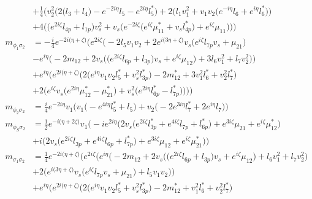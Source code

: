 \begin{itemize}
\begin{align}
 &+\frac{1}{4} \Big(v_{2}^{2} \Big(2 \Big(l_3 + l_4\Big) - e^{-2 i \eta } l_5  - e^{2 i \eta } l_5^* \Big)+2 \Big(l_1 v_{1}^{2}  + v_1 v_2 \Big(e^{-i \eta } l_6  + e^{i \eta } l_6^* \Big)\Big)\nonumber \\ 
 &+4 \Big(\Big(e^{2 i \zeta } l_{4p}  + l_{1p}\Big)v_{s}^{2}  + v_s \Big(e^{-2 i \zeta } \Big(e^{i \zeta } \mu_{11}^*  + v_s l_{4p}^* \Big) + e^{i \zeta } \mu_{11} \Big)\Big)\Big)\\ 
m_{\phi_1\sigma_2} &= -\frac{i}{4} e^{-2 i \Big(\eta +\zeta \Big)} \Big(e^{2 i \zeta } \Big(-2 l_5 v_1 v_2 +2 e^{i \Big(3 \eta +\zeta \Big)} v_s \Big(e^{i \zeta } l_{7p} v_s  + \mu_{21}\Big)\nonumber \\ 
 &- e^{i \eta } \Big(-2 m_{12}  + 2 v_s \Big(\Big(e^{2 i \zeta } l_{6p}  + l_{3p}\Big)v_s  + e^{i \zeta } \mu_{12} \Big) + 3 l_6 v_{1}^{2}  + l_7 v_{2}^{2} \Big)\Big)\nonumber \\ 
 &+e^{i \eta } \Big(e^{2 i \Big(\eta +\zeta \Big)} \Big(2 \Big(e^{i \eta } v_1 v_2 l_5^*  + v_{s}^{2} l_{3p}^* \Big) -2 m_{12}^*  + 3 v_{1}^{2} l_6^*  + v_{2}^{2} l_7^* \Big)\nonumber \\ 
 &+2 \Big(e^{i \zeta } v_s \Big(e^{2 i \eta } \mu_{12}^*  - \mu_{21}^* \Big) + v_{s}^{2} \Big(e^{2 i \eta } l_{6p}^*  - l_{7p}^* \Big)\Big)\Big)\Big)\\ 
m_{\phi_2\sigma_2} &= \frac{i}{4} e^{-2 i \eta } v_1 \Big(v_1 \Big(- e^{4 i \eta } l_5^*  + l_5\Big) + v_2 \Big(-2 e^{3 i \eta } l_7^*  + 2 e^{i \eta } l_7 \Big)\Big)\\ 
m_{\phi_S\sigma_2} &= \frac{1}{2} e^{-i \Big(\eta +2 \zeta \Big)} v_1 \Big(-i e^{2 i \eta } \Big(2 v_s \Big(e^{2 i \zeta } l_{3p}^*  + e^{4 i \zeta } l_{7p}  + l_{6p}^*\Big) + e^{3 i \zeta } \mu_{21}  + e^{i \zeta } \mu_{12}^* \Big)\nonumber \\ 
 &+i \Big(2 v_s \Big(e^{2 i \zeta } l_{3p}  + e^{4 i \zeta } l_{6p}  + l_{7p}^*\Big) + e^{3 i \zeta } \mu_{12}  + e^{i \zeta } \mu_{21}^* \Big)\Big)\\ 
m_{\sigma_1\sigma_2} &= \frac{1}{4} e^{-2 i \Big(\eta +\zeta \Big)} \Big(e^{2 i \zeta } \Big(e^{i \eta } \Big(-2 m_{12}  + 2 v_s \Big(\Big(e^{2 i \zeta } l_{6p}  + l_{3p}\Big)v_s  + e^{i \zeta } \mu_{12} \Big) + l_6 v_{1}^{2}  + l_7 v_{2}^{2} \Big)\nonumber \\ 
 &+2 \Big(e^{i \Big(3 \eta +\zeta \Big)} v_s \Big(e^{i \zeta } l_{7p} v_s  + \mu_{21}\Big) + l_5 v_1 v_2 \Big)\Big)\nonumber \\ 
 &+e^{i \eta } \Big(e^{2 i \Big(\eta +\zeta \Big)} \Big(2 \Big(e^{i \eta } v_1 v_2 l_5^*  + v_{s}^{2} l_{3p}^* \Big) -2 m_{12}^*  + v_{1}^{2} l_6^*  + v_{2}^{2} l_7^* \Big)\nonumber \\ 

\end{align}
\end{itemize}

